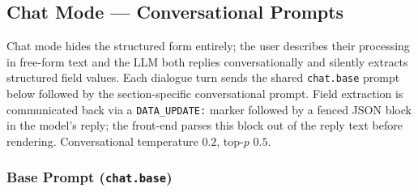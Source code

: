 \subsection{Chat Mode --- Conversational Prompts}
\label{app:ropagen-prompts-chat}

Chat mode hides the structured form entirely; the user describes their processing in free-form text and the LLM both replies conversationally and silently extracts structured field values. Each dialogue turn sends the shared \texttt{chat.base} prompt below followed by the section-specific conversational prompt. Field extraction is communicated back via a \texttt{DATA\_UPDATE:} marker followed by a fenced JSON block in the model's reply; the front-end parses this block out of the reply text before rendering. Conversational temperature $0.2$, top-$p$ $0.5$.

\subsubsection*{Base Prompt (\texttt{chat.base})}

